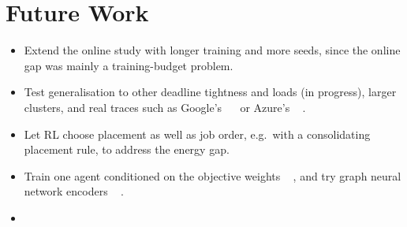 \documentclass[12pt]{article}
\providecommand{\DIFaddtex}[1]{{\color{red}#1}} %
\providecommand{\DIFdeltex}[1]{} %
\providecommand{\DIFaddbegin}{} %
\providecommand{\DIFaddend}{} %
\providecommand{\DIFdelbegin}{} %
\providecommand{\DIFdelend}{} %
\providecommand{\DIFadd}[1]{\texorpdfstring{\DIFaddtex{#1}}{#1}} %
\providecommand{\DIFdel}[1]{\texorpdfstring{\DIFdeltex{#1}}{}} %
\providecommand{\DIFscaledelfig}{0.5}
\newlength{\DIFdelgraphicswidth} %
\newlength{\DIFdelgraphicsheight} %
\providecommand{\DIFaddincludegraphics}[2][]{{\color{blue}\fbox{\DIFOincludegraphics[#1]{#2}}}} %
\providecommand{\DIFdelincludegraphics}[2][]{%
\sbox{\DIFdelgraphicsbox}{\DIFOincludegraphics[#1]{#2}}%
\settoboxwidth{\DIFdelgraphicswidth}{\DIFdelgraphicsbox} %
\settoboxtotalheight{\DIFdelgraphicsheight}{\DIFdelgraphicsbox} %
\scalebox{\DIFscaledelfig}{%
\parbox[b]{\DIFdelgraphicswidth}{\usebox{\DIFdelgraphicsbox}\\[-\baselineskip] \rule{\DIFdelgraphicswidth}{0em}}\llap{\resizebox{\DIFdelgraphicswidth}{\DIFdelgraphicsheight}{%
\setlength{\unitlength}{\DIFdelgraphicswidth}%
\begin{picture}(1,1)%
\thicklines\linethickness{2pt} %
{\color[rgb]{1,0,0}\put(0,0){\framebox(1,1){}}}%
{\color[rgb]{1,0,0}\put(0,0){\line( 1,1){1}}}%
{\color[rgb]{1,0,0}\put(0,1){\line(1,-1){1}}}%
\end{picture}%
}\hspace*{3pt}}} %
} %
\DeclareRobustCommand{\DIFaddbegin}{\DIFOaddbegin \let\includegraphics\DIFaddincludegraphics} %
\DeclareRobustCommand{\DIFaddend}{\DIFOaddend \let\includegraphics\DIFOincludegraphics} %
\DeclareRobustCommand{\DIFdelbegin}{\DIFOdelbegin \let\includegraphics\DIFdelincludegraphics} %
\DeclareRobustCommand{\DIFdelend}{\DIFOaddend \let\includegraphics\DIFOincludegraphics} %
\begin{document}
\section{Future Work}
\begin{itemize}
    \item \DIFdelbegin \DIFdel{More research and consideration into the online case. The online case remains incredibly complex and this projectonly touches on it briefly. }\DIFdelend \DIFaddbegin \DIFadd{Extend the online study with longer training and more seeds, since the online gap was mainly a training-budget problem.
    }\DIFaddend \item \DIFdelbegin \DIFdel{Look more into hybrid architectures \mbox{%
\cite{ml_ra_litrev2025}
    }\hskip0pt%
}\DIFdelend \DIFaddbegin \DIFadd{Test generalisation to other deadline tightness and loads (in progress), larger clusters, and real traces such as Google's \mbox{%
\cite{reiss2012googletrace} }\hskip0pt%
or Azure's \mbox{%
\cite{cortez2017resourcecentral}}\hskip0pt%
.
    }\DIFaddend \item \DIFdelbegin \DIFdel{Adopt simulation-based training and interactive learning environments \mbox{%
\cite{ml_ra_litrev2025}
    }\hskip0pt%
}\DIFdelend \DIFaddbegin \DIFadd{Let RL choose placement as well as job order, e.g.\ with a consolidating placement rule, to address the energy gap.
    }\DIFaddend \item \DIFdelbegin \DIFdel{Considering more and different metrics and objectives
    }\DIFdelend \DIFaddbegin \DIFadd{Train one agent conditioned on the objective weights \mbox{%
\cite{abels2019dynamicweights, hayes2022morlguide}}\hskip0pt%
, and try graph neural network encoders \mbox{%
\cite{gnn2024jsspsurvey}}\hskip0pt%
.
    }\DIFaddend \item \DIFdelbegin \DIFdel{Examine the large action-space failure of policy-based methods, and evaluate how different methods compare and potentially aid in this project's future findings.

This includes replacing the current pointer network encoding with graph neural networks for job /machine encoding \mbox{%
\cite{gnn2024jsspsurvey}}\hskip0pt%
, and a variety of action-space reductions and branching \mbox{%
\cite{tavakoli2018actionbranching}
    }\hskip0pt%
}%

\DIFdel{Evaluate large discrete action space methods such as the Wolpertinger architecture \mbox{%
\cite{dulacarnold2015largeactionspaces}
    }\hskip0pt%
}%


\end{itemize}
\end{document}
